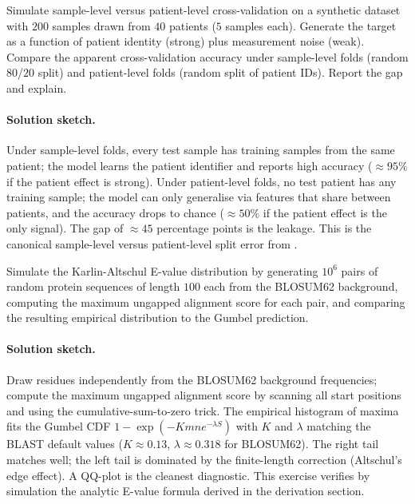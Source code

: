 \begin{exercise}
Simulate sample-level versus patient-level cross-validation on a
synthetic dataset with $200$ samples drawn from $40$ patients ($5$
samples each). Generate the target as a function of patient identity
(strong) plus measurement noise (weak). Compare the apparent
cross-validation accuracy under sample-level folds (random
$80$/$20$ split) and patient-level folds (random split of patient
IDs). Report the gap and explain.

\paragraph{Solution sketch.}
Under sample-level folds, every test sample has training samples from
the same patient; the model learns the patient identifier and reports
high accuracy ($\approx 95\%$ if the patient effect is strong).
Under patient-level folds, no test patient has any training sample;
the model can only generalise via features that share between
patients, and the accuracy drops to chance ($\approx 50\%$ if the
patient effect is the only signal). The gap of $\approx 45$
percentage points is the leakage. This is the canonical sample-level
versus patient-level split error from
.
\end{exercise}

\begin{exercise}
Simulate the Karlin-Altschul E-value distribution by generating
$10^{6}$ pairs of random protein sequences of length $100$ each from
the BLOSUM62 background, computing the maximum ungapped alignment
score for each pair, and comparing the resulting empirical
distribution to the Gumbel prediction.

\paragraph{Solution sketch.}
Draw residues independently from the BLOSUM62 background frequencies;
compute the maximum ungapped alignment score by scanning all start
positions and using the cumulative-sum-to-zero trick. The empirical
histogram of maxima fits the Gumbel CDF $1 - \exp(-K m n e^{-\lambda
S})$ with $K$ and $\lambda$ matching the BLAST default values
($K \approx 0.13$, $\lambda \approx 0.318$ for BLOSUM62). The right
tail matches well; the left tail is dominated by the finite-length
correction (Altschul's edge effect). A QQ-plot is the cleanest
diagnostic. This exercise verifies by simulation the analytic E-value
formula derived in the derivation section.
\end{exercise}

